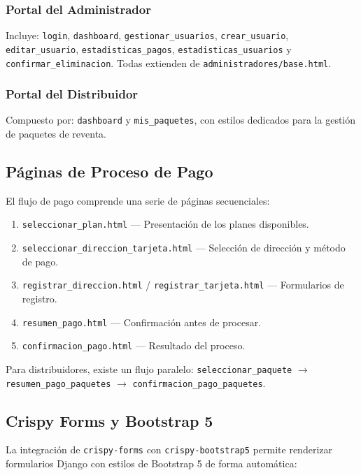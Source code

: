 \documentclass[12pt, a4paper]{article}
\begin{document}
\subsubsection{Portal del Administrador}
Incluye: \texttt{login}, \texttt{dashboard}, \texttt{gestionar\_usuarios}, \texttt{crear\_usuario}, \texttt{editar\_usuario}, \texttt{estadisticas\_pagos}, \texttt{estadisticas\_usuarios} y \texttt{confirmar\_eliminacion}. Todas extienden de \texttt{administradores/base.html}.

\subsubsection{Portal del Distribuidor}
Compuesto por: \texttt{dashboard} y \texttt{mis\_paquetes}, con estilos dedicados para la gestión de paquetes de reventa.

\subsection{Páginas de Proceso de Pago}

El flujo de pago comprende una serie de páginas secuenciales:
\begin{enumerate}
    \item \texttt{seleccionar\_plan.html} --- Presentación de los planes disponibles.
    \item \texttt{seleccionar\_direccion\_tarjeta.html} --- Selección de dirección y método de pago.
    \item \texttt{registrar\_direccion.html} / \texttt{registrar\_tarjeta.html} --- Formularios de registro.
    \item \texttt{resumen\_pago.html} --- Confirmación antes de procesar.
    \item \texttt{confirmacion\_pago.html} --- Resultado del proceso.
\end{enumerate}

Para distribuidores, existe un flujo paralelo: \texttt{seleccionar\_paquete} $\rightarrow$ \texttt{resumen\_pago\_paquetes} $\rightarrow$ \texttt{confirmacion\_pago\_paquetes}.

\subsection{Crispy Forms y Bootstrap 5}

La integración de \texttt{crispy-forms} con \texttt{crispy-bootstrap5} permite renderizar formularios Django con estilos de Bootstrap 5 de forma automática:
\end{document}

